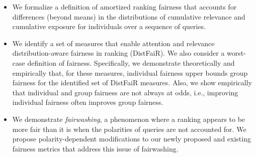 \begin{itemize}
    \item We formalize a definition of amortized ranking fairness that accounts for differences (beyond means) in the distributions of cumulative relevance and cumulative exposure for individuals over a sequence of queries.
    \item We identify a set of measures that enable attention and relevance distribution-aware fairness in ranking (DistFaiR). We also consider a worst-case definition of fairness. %
    Specifically, we demonstrate theoretically and empirically that, for these measures, individual fairness upper bounds group fairness for the identified set of DistFaiR measures. Also, we show empirically that individual and group fairness are not always at odds, i.e., improving individual fairness often improves group fairness. 
    \item We demonstrate {\em fairwashing}, a phenomenon where a ranking appears to be more fair than it is when the polarities of queries are not accounted for. We propose polarity-dependent modifications to our newly proposed and existing fairness metrics that address this issue of fairwashing.
    
\end{itemize}




\vspace{-0.2em}
